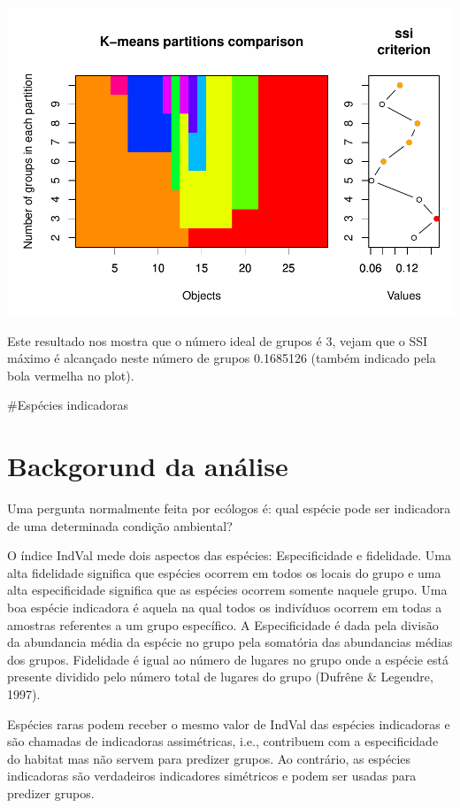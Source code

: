 \documentclass[
]{book}
\begin{document}
\includegraphics{livro_r_ecologia_files/figure-latex/unnamed-chunk-12-1.pdf}

Este resultado nos mostra que o número ideal de grupos é 3, vejam que o SSI máximo é alcançado neste número de grupos 0.1685126 (também indicado pela bola vermelha no plot).

\#Espécies indicadoras

\hypertarget{backgorund-da-anuxe1lise-2}{%
\section{Backgorund da análise}\label{backgorund-da-anuxe1lise-2}}

Uma pergunta normalmente feita por ecólogos é: qual espécie pode ser indicadora de uma determinada condição ambiental?

O índice IndVal mede dois aspectos das espécies: Especificidade e fidelidade. Uma alta fidelidade significa que espécies ocorrem em todos os locais do grupo e uma alta especificidade significa que as espécies ocorrem somente naquele grupo. Uma boa espécie indicadora é aquela na qual todos os indivíduos ocorrem em todas a amostras referentes a um grupo específico.
A Especificidade é dada pela divisão da abundancia média da espécie no grupo pela somatória das abundancias médias dos grupos. Fidelidade é igual ao número de lugares no grupo onde a espécie está presente dividido pelo número total de lugares do grupo (Dufrêne \& Legendre, 1997).

Espécies raras podem receber o mesmo valor de IndVal das espécies indicadoras e são chamadas de indicadoras assimétricas, i.e., contribuem com a especificidade do habitat mas não servem para predizer grupos. Ao contrário, as espécies indicadoras são verdadeiros indicadores simétricos e podem ser usadas para predizer grupos.
\end{document}
